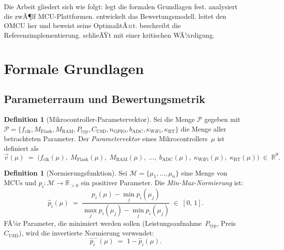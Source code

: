 ﻿\documentclass[12pt, a4paper]{article}
\theoremstyle{plain}
\theoremstyle{definition}
\newtheorem{definition}[theorem]{Definition}
\theoremstyle{remark}
\newcommand{\omcu}{\textsc{OMCU}}
\newcommand{\RR}{\mathbb{R}}
\begin{document}
Die Arbeit gliedert sich wie folgt:
 legt die formalen Grundlagen fest.
 analysiert die zwÃ¶lf MCU-Plattformen.
 entwickelt das Bewertungsmodell.
 leitet den \omcu{} her und beweist seine OptimalitÃ¤t.
 beschreibt die Referenzimplementierung.
 schlieÃŸt mit einer kritischen WÃ¼rdigung.

\section{Formale Grundlagen}
\label{sec:grundlagen}

\subsection{Parameterraum und Bewertungsmetrik}

\begin{definition}[Mikrocontroller-Parametervektor]
\label{def:parametervektor}
  Sei die Menge $\mathcal{P}$ gegeben mit $\mathcal{P} = \{f_\text{clk}, M_\text{Flash}, M_\text{RAM},
  P_\text{typ}, C_\text{USD}, n_\text{GPIO}, b_\text{ADC},
  \kappa_\text{WiFi}, \kappa_\text{BT}\}$ die Menge aller betrachteten
  Parameter.
  Der \emph{Parametervektor} eines Mikrocontrollers~$\mu$ ist definiert als
  \[
    \vec{v}(\mu) \;=\;
    \bigl(
      f_\text{clk}(\mu),\;
      M_\text{Flash}(\mu),\;
      M_\text{RAM}(\mu),\;
      \ldots ,\;
      b_\text{ADC}(\mu),\;
      \kappa_\text{WiFi}(\mu),\;
      \kappa_\text{BT}(\mu)
    \bigr)
    \;\in\; \RR^9.
  \]
\end{definition}

\begin{definition}[Normierungsfunktion]
\label{def:normierung}
  Sei $\mathcal{M} = \{\mu_1, \ldots, \mu_n\}$ eine Menge von MCUs und
  $p_i \colon \mathcal{M} \to \RR_{>0}$ ein positiver Parameter.
  Die \emph{Min-Max-Normierung} ist:
  \[
    \hat{p}_i(\mu) \;=\;
    \frac{p_i(\mu) - \min_j p_i(\mu_j)}
         {\max_j p_i(\mu_j) - \min_j p_i(\mu_j)}
    \;\in\; [0,\,1].
  \]
  FÃ¼r Parameter, die minimiert werden sollen
  (Leistungsaufnahme~$P_\text{typ}$, Preis~$C_\text{USD}$),
  wird die invertierte Normierung verwendet:
  \[
    \hat{p}_i^{\,-}(\mu) \;=\; 1 - \hat{p}_i(\mu).
  \]
\end{definition}
\end{document}
